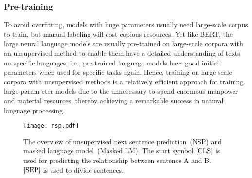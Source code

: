 \subsubsection{Pre-training} 
To avoid overfitting, models with huge parameters usually need large-scale corpus to train, but manual labeling will cost copious resources. Yet like BERT, the large neural language models are usually pre-trained on large-scale corpora with an unsupervised method to enable them have a detailed understanding of texts on specific languages, i.e., pre-trained language models have good initial parameters when used for specific tasks again. Hence, training on large-scale corpora with unsupervised methods is a relatively efficient approach for training large-param-eter models due to the unnecessary to spend enormous manpower and material resources, thereby achieving a remarkable success in natural language processing.      

\begin{figure}[t]
    \centering
    \texttt{[image: nsp.pdf]}
    \caption{The overview of unsupervised next sentence prediction~(NSP) and masked language model~(Masked LM). The start symbol $\rm[CLS]$ is used for predicting the relationship between sentence A and B. $\rm[SEP]$ is used to divide sentences.}
    \label{fig:nsp}
\end{figure}

